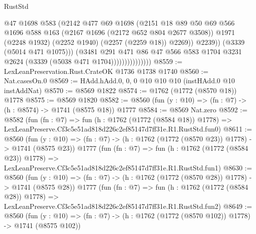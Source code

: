 \begin{lexlean}{RustStd}
\begin{coremodule}
                                  @47
                                  @1698
                                  @583
                                  (@2142
                                    @477
                                    @69
                                    @1698
                                    (@2151
                                      @18
                                      @89
                                      @50
                                      @69
                                      @566
                                      @1696
                                      @588
                                      @163
                                      (@2167 @1696 (@2172 @652 @804 @2677 @3508))
                                      @1971
                                      (@2248 @1932)
                                      (@2252 @1940)
                                      (@2257 (@2259 @18))
                                      @2269))
                                  @2239))
                              (@3339 (@5014 @471 @1075)))
                            (@3481
                              @291
                              @471
                              @86
                              @47
                              @566
                              @583
                              @1704
                              @3231
                              @2624
                              (@3339 (@5038 @471 @1704)))))))))))))))
@8559 := LexLeanPreservation.Rust.CrateOK @1736 @1738 @1740
@8560 := Nat.casesOn.{0}
@8569 := HAdd.hAdd.{0, 0, 0} @10 @10 @10 (instHAdd.{0} @10 instAddNat)
@8570 := @8569 @1822
@8574 := @1762 (@1772 (@8570 @18)) @1778
@8575 := @8569 @1820
@8582 := @8560 (fun (y : @10) => (fn : @7) -> (h : @8574) -> @1741 (@8575 @18)) @1777
@8584 := @8569 Nat.zero
@8592 := @8582
    (fun (fn : @7) =>
    fun (h : @1762 (@1772 (@8584 @18)) @1778) =>
    LexLeanPreserve.Cf3c5e51ad818d226c2ef85147d7ff31e.R1.RustStd.fun0)
@8611 := @8560
    (fun (y : @10) => (fn : @7) -> (h : @1762 (@1772 (@8570 @23)) @1778) -> @1741 (@8575 @23))
    @1777
    (fun (fn : @7) =>
    fun (h : @1762 (@1772 (@8584 @23)) @1778) =>
    LexLeanPreserve.Cf3c5e51ad818d226c2ef85147d7ff31e.R1.RustStd.fun1)
@8630 := @8560
    (fun (y : @10) => (fn : @7) -> (h : @1762 (@1772 (@8570 @28)) @1778) -> @1741 (@8575 @28))
    @1777
    (fun (fn : @7) =>
    fun (h : @1762 (@1772 (@8584 @28)) @1778) =>
    LexLeanPreserve.Cf3c5e51ad818d226c2ef85147d7ff31e.R1.RustStd.fun2)
@8649 := @8560
    (fun (y : @10) => (fn : @7) -> (h : @1762 (@1772 (@8570 @102)) @1778) -> @1741 (@8575 @102))

\end{coremodule}
\end{lexlean}
